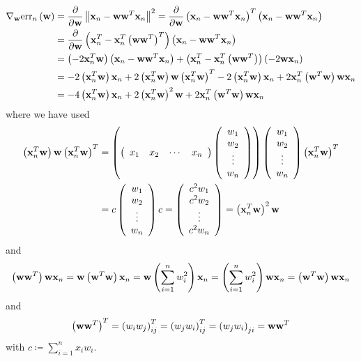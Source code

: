 \documentclass[12pt]{article}
\newcommand{\ParTh}[1]{\left(#1\right)}
\newcommand{\BF}[1]{{\bf#1}}
\newcommand{\VecAbsVal}[1]{\left\|#1\right\|}
\newcommand{\Matrix}[2]{\ParTh{\begin{array}{#1}#2\end{array}}}
\begin{document}
\begin{align}
\nabla_{\BF{w}}\text{err}_n\ParTh{\BF{w}}&=\dfrac{\partial}{\partial\BF{w}}\VecAbsVal{\BF{x}_n-\BF{w}\BF{w}^T\BF{x}_n}^2=\dfrac{\partial}{\partial\BF{w}}\ParTh{\BF{x}_n-\BF{w}\BF{w}^T\BF{x}_n}^T\ParTh{\BF{x}_n-\BF{w}\BF{w}^T\BF{x}_n}\\
&=\dfrac{\partial}{\partial\BF{w}}\ParTh{\BF{x}^T_n-\BF{x}^T_n\ParTh{\BF{w}\BF{w}^T}^T}\ParTh{\BF{x}_n-\BF{w}\BF{w}^T\BF{x}_n}\\
&=\ParTh{-2\BF{x}^T_n\BF{w}}\ParTh{\BF{x}_n-\BF{w}\BF{w}^T\BF{x}_n}+\ParTh{\BF{x}^T_n-\BF{x}^T_n\ParTh{\BF{w}\BF{w}^T}}\ParTh{-2\BF{w}\BF{x}_n}\\
&=-2\ParTh{\BF{x}^T_n\BF{w}}\BF{x}_n+2\ParTh{\BF{x}^T_n\BF{w}}\BF{w}\ParTh{\BF{x}^T_n\BF{w}}^T-2\ParTh{\BF{x}^T_n\BF{w}}\BF{x}_n+2\BF{x}^T_n\ParTh{\BF{w}^T\BF{w}}\BF{w}\BF{x}_n\\
&=-4\ParTh{\BF{x}^T_n\BF{w}}\BF{x}_n+2\ParTh{\BF{x}^T_n\BF{w}}^2\BF{w}+2\BF{x}^T_n\ParTh{\BF{w}^T\BF{w}}\BF{w}\BF{x}_n
\end{align}
where we have used
\begin{align}
\ParTh{\BF{x}^T_n\BF{w}}\BF{w}\ParTh{\BF{x}^T_n\BF{w}}^T&=\ParTh{\Matrix{cccc}{x_1&x_2&\cdots&x_n}\Matrix{c}{w_{1}\\w_{2}\\\vdots\\w_{n}}}\Matrix{c}{w_{1}\\w_{2}\\\vdots\\w_{n}}\ParTh{\BF{x}^T_n\BF{w}}^T\\
&=c\Matrix{c}{w_{1}\\w_{2}\\\vdots\\w_{n}}c=\Matrix{c}{c^2w_{1}\\c^2w_{2}\\\vdots\\c^2w_{n}}=\ParTh{\BF{x}^T_n\BF{w}}^2\BF{w}
\end{align}
and
\begin{align}
\ParTh{\BF{w}\BF{w}^T}\BF{w}\BF{x}_n=\BF{w}\ParTh{\BF{w}^T\BF{w}}\BF{x}_n=\BF{w}\ParTh{\sum_{i=1}^{n}w^2_i}\BF{x}_n=\ParTh{\sum_{i=1}^{n}w^2_i}\BF{w}\BF{x}_n=\ParTh{\BF{w}^T\BF{w}}\BF{w}\BF{x}_n
\end{align}
and
\begin{align}
\ParTh{\BF{w}\BF{w}^T}^T=\ParTh{w_iw_j}^T_{ij}=\ParTh{w_jw_i}^T_{ij}=\ParTh{w_jw_i}_{ji}=\BF{w}\BF{w}^T
\end{align}
with $c\coloneqq\sum_{i=1}^{n}x_iw_i$.
\end{document}
